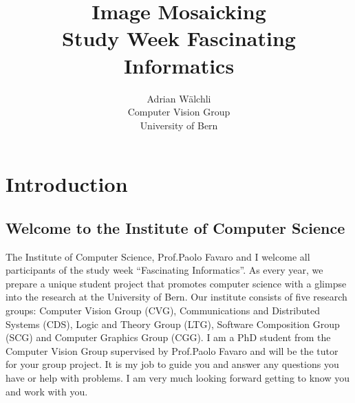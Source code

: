 \documentclass[a4paper]{article}
\title{Image Mosaicking \\ Study Week Fascinating Informatics}
\author{Adrian W\"alchli \\ Computer Vision Group \\ University of Bern}
\begin{document}
\maketitle
\tableofcontents
\newpage


\section{Introduction}

	\subsection{Welcome to the Institute of Computer Science}
		The Institute of Computer Science, Prof.\@ Paolo Favaro and I welcome all participants of the study week ``Fascinating Informatics''.
		As every year, we prepare a unique student project that promotes computer science with a glimpse into the research at the University of Bern.
		Our institute consists of five research groups: Computer Vision Group (CVG), Communications and Distributed Systems (CDS), Logic and Theory Group (LTG), Software Composition Group (SCG) and Computer Graphics Group (CGG).
		I am a PhD student from the Computer Vision Group supervised by Prof.\@ Paolo Favaro and will be the tutor for your group project.
		It is my job to guide you and answer any questions you have or help with problems.
		I am very much looking forward getting to know you and work with you.

		
\end{document}
